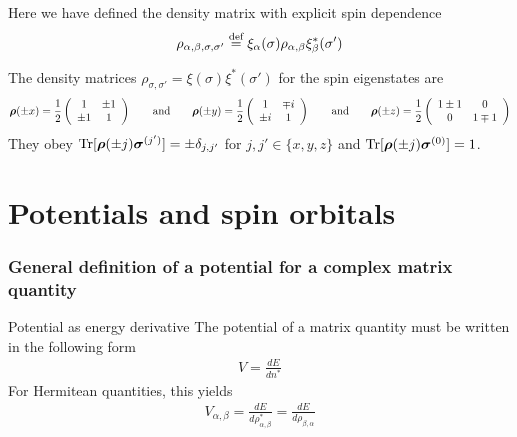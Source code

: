 \documentclass[11pt,a4paper]{report}
\begin{document}
Here we have defined the density matrix with explicit spin dependence
\begin{eqnarray}
\rho_{\alpha,\beta,\sigma,\sigma'}\stackrel{\text{def}}{=}\xi_\alpha(\sigma)\rho_{\alpha,\beta}\xi^*_\beta(\sigma')
\label{eq:defdensitymatrixwithspindep}
\end{eqnarray}

The density matrices
$\rho_{\sigma,\sigma'}=\xi(\sigma)\xi^*(\sigma')$ for the spin
eigenstates 
are
\begin{eqnarray*}
\bm{\rho}(\pm x)=\frac{1}{2}\left(\begin{array}{cc}1&\pm1\\\pm1&1\end{array}\right)
\qquad\text{and}\qquad
\bm{\rho}(\pm y)=\frac{1}{2}\left(\begin{array}{cc}1&\mp i\\\pm i&1\end{array}\right)
\qquad\text{and}\qquad
\bm{\rho}(\pm z)=\frac{1}{2}\left(\begin{array}{cc}1\pm1& 0\\0&1\mp1\end{array}\right)
\end{eqnarray*}
They obey $\mathrm{Tr}[\bm{\rho}(\pm
  j)\bm{\sigma}^{(j')}]=\pm\delta_{j,j'}$ for $j,j'\in\{x,y,z\}$ and 
$\mathrm{Tr}[\bm{\rho}(\pm j)\bm{\sigma}^{(0)}]=1$.






\section{Potentials and spin orbitals}

\subsubsection{General definition of a potential for a complex matrix quantity}
\begin{myshadowminipage}{Potential as energy derivative}
The potential of a matrix quantity must be written in the following
form
\begin{eqnarray*}
V=\frac{dE}{dn^*}
\end{eqnarray*}
For Hermitean quantities, this yields 
\begin{eqnarray*}
V_{\alpha,\beta}=\frac{dE}{d\rho_{\alpha,\beta}^*}=\frac{dE}{d\rho_{\beta,\alpha}}
\end{eqnarray*}
\end{myshadowminipage}
\end{document}
